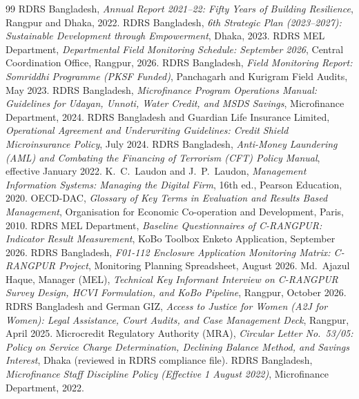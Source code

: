 \documentclass[12pt,a4paper]{report}
\begin{document}
\begin{thebibliography}{99}
\setlength{\itemsep}{1.5pt}\setlength{\parskip}{0pt}
 RDRS Bangladesh, \textit{Annual Report 2021--22: Fifty Years of Building Resilience}, Rangpur and Dhaka, 2022.
 RDRS Bangladesh, \textit{6th Strategic Plan (2023--2027): Sustainable Development through Empowerment}, Dhaka, 2023.
 RDRS MEL Department, \textit{Departmental Field Monitoring Schedule: September 2026}, Central Coordination Office, Rangpur, 2026.
 RDRS Bangladesh, \textit{Field Monitoring Report: Somriddhi Programme (PKSF Funded)}, Panchagarh and Kurigram Field Audits, May 2023.
 RDRS Bangladesh, \textit{Microfinance Program Operations Manual: Guidelines for Udayan, Unnoti, Water Credit, and MSDS Savings}, Microfinance Department, 2024.
 RDRS Bangladesh and Guardian Life Insurance Limited, \textit{Operational Agreement and Underwriting Guidelines: Credit Shield Microinsurance Policy}, July 2024.
 RDRS Bangladesh, \textit{Anti-Money Laundering (AML) and Combating the Financing of Terrorism (CFT) Policy Manual}, effective January 2022.
 K.~C.~Laudon and J.~P.~Laudon, \textit{Management Information Systems: Managing the Digital Firm}, 16th ed., Pearson Education, 2020.
 OECD-DAC, \textit{Glossary of Key Terms in Evaluation and Results Based Management}, Organisation for Economic Co-operation and Development, Paris, 2010.
 RDRS MEL Department, \textit{Baseline Questionnaires of C-RANGPUR: Indicator Result Measurement}, KoBo Toolbox Enketo Application, September 2026.
 RDRS Bangladesh, \textit{F01-112 Enclosure Application Monitoring Matrix: C-RANGPUR Project}, Monitoring Planning Spreadsheet, August 2026.
 Md.~Ajazul Haque, Manager (MEL), \textit{Technical Key Informant Interview on C-RANGPUR Survey Design, HCVI Formulation, and KoBo Pipeline}, Rangpur, October 2026.
 RDRS Bangladesh and German GIZ, \textit{Access to Justice for Women (A2J for Women): Legal Assistance, Court Audits, and Case Management Deck}, Rangpur, April 2025.
 Microcredit Regulatory Authority (MRA), \textit{Circular Letter No.~53/05: Policy on Service Charge Determination, Declining Balance Method, and Savings Interest}, Dhaka (reviewed in RDRS compliance file).
 RDRS Bangladesh, \textit{Microfinance Staff Discipline Policy (Effective 1 August 2022)}, Microfinance Department, 2022.
\end{thebibliography}
\end{document}
